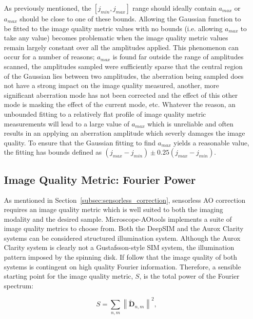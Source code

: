 As previously mentioned, the $[j_{min},j_{max}]$ range should ideally contain $a_{max}$ or $a_{max}$ should be close to one of these bounds. Allowing the Gaussian function to be fitted to the image quality metric values with no bounds (i.e. allowing $a_{max}$ to take any value) becomes problematic when the image quality metric values remain largely constant over all the amplitudes applied. This phenomenon can occur for a number of reasons; $a_{max}$ is found far outside the range of amplitudes scanned, the amplitudes sampled were sufficiently sparse that the central region of the Gaussian lies between two amplitudes, the aberration being sampled does not have a strong impact on the image quality measured, another, more significant aberration mode has not been corrected and the effect of this other mode is masking the effect of the current mode, etc. Whatever the reason, an unbounded fitting to a relatively flat profile of image quality metric measurements will lead to a large value of $a_{max}$ which is unreliable and often results in an applying an aberration amplitude which severly damages the image quality. To ensure that the Gaussian fitting to find $a_{max}$ yields a reasonable value, the fitting has bounds defined as $(j_{max}-j_{min}) \pm 0.25(j_{max}-j_{min})$.

\subsection{Image Quality Metric: Fourier Power}
\label{subsec:fourier_power_metric}

As mentioned in Section~\ref{subsec:sensorless_correction}, 
sensorless AO correction requires an image quality metric which
is well suited to both the imaging modality and the desired 
sample. Microscope-AOtools implements a suite of image quality
metrics to choose from. Both the DeepSIM and the Aurox
Clarity systems can be considered structured illumination
system. Although the Aurox Clarity system is clearly not a 
Gustafsson-style SIM system, the illumination pattern imposed by
the spinning disk. If follow that the image quality of both systems is
contingent on high quality Fourier information. Therefore, 
a sensible starting point for the image quality metric, $S$, 
is the total power of the Fourier spectrum:

\begin{equation}\label{eq:fourier_power_spectrum}
S = \sum\limits_{n,m}{\left\| \tilde{\textbf{D}}_{n,m} \right\|^2},
\end{equation}

